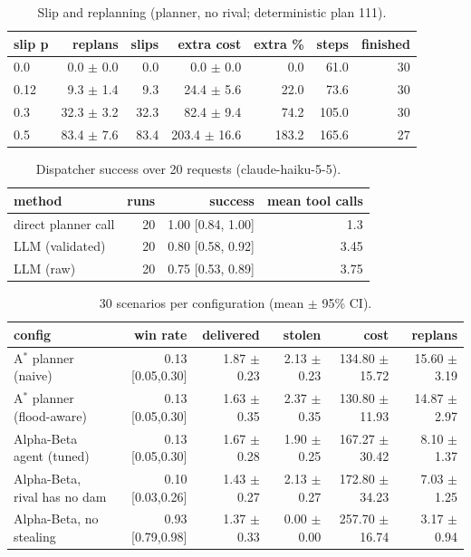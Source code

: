 \begin{table}[t]
\centering
\footnotesize
\caption{Slip and replanning (planner, no rival; deterministic plan 111).}
\label{tab:slip}
\setlength{\tabcolsep}{3pt}
\begin{tabular}{lrrrrrr}
\toprule
slip p & replans & slips & extra cost & extra \% & steps & finished \\
\midrule
0.0 & 0.0 $\pm$ 0.0 & 0.0 & 0.0 $\pm$ 0.0 & 0.0 & 61.0 & 30 \\
0.12 & 9.3 $\pm$ 1.4 & 9.3 & 24.4 $\pm$ 5.6 & 22.0 & 73.6 & 30 \\
0.3 & 32.3 $\pm$ 3.2 & 32.3 & 82.4 $\pm$ 9.4 & 74.2 & 105.0 & 30 \\
0.5 & 83.4 $\pm$ 7.6 & 83.4 & 203.4 $\pm$ 16.6 & 183.2 & 165.6 & 27 \\
\bottomrule
\end{tabular}
\end{table}

\begin{table}[t]
\centering
\footnotesize
\caption{Dispatcher success over 20 requests (claude-haiku-5-5).}
\label{tab:llm}
\setlength{\tabcolsep}{3pt}
\begin{tabular}{lrrr}
\toprule
method & runs & success & mean tool calls \\
\midrule
direct planner call & 20 & 1.00 [0.84, 1.00] & 1.3 \\
LLM (validated) & 20 & 0.80 [0.58, 0.92] & 3.45 \\
LLM (raw) & 20 & 0.75 [0.53, 0.89] & 3.75 \\
\bottomrule
\end{tabular}
\end{table}

\begin{table}[t]
\centering
\footnotesize
\caption{30 scenarios per configuration (mean $\pm$ 95\% CI).}
\label{tab:configs}
\setlength{\tabcolsep}{3pt}
\begin{tabular}{lrrrrr}
\toprule
config & win rate & delivered & stolen & cost & replans \\
\midrule
A$^*$ planner (naive) & 0.13 [0.05,0.30] & 1.87 $\pm$ 0.23 & 2.13 $\pm$ 0.23 & 134.80 $\pm$ 15.72 & 15.60 $\pm$ 3.19 \\
A$^*$ planner (flood-aware) & 0.13 [0.05,0.30] & 1.63 $\pm$ 0.35 & 2.37 $\pm$ 0.35 & 130.80 $\pm$ 11.93 & 14.87 $\pm$ 2.97 \\
Alpha-Beta agent (tuned) & 0.13 [0.05,0.30] & 1.67 $\pm$ 0.28 & 1.90 $\pm$ 0.25 & 167.27 $\pm$ 30.42 & 8.10 $\pm$ 1.37 \\
Alpha-Beta, rival has no dam & 0.10 [0.03,0.26] & 1.43 $\pm$ 0.27 & 2.13 $\pm$ 0.27 & 172.80 $\pm$ 34.23 & 7.03 $\pm$ 1.25 \\
Alpha-Beta, no stealing & 0.93 [0.79,0.98] & 1.37 $\pm$ 0.33 & 0.00 $\pm$ 0.00 & 257.70 $\pm$ 16.74 & 3.17 $\pm$ 0.94 \\
\bottomrule
\end{tabular}
\end{table}

